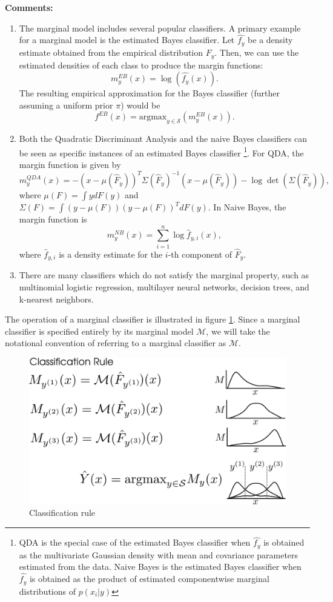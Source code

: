 \textbf{Comments:}
\begin{enumerate}
\item The marginal model includes several popular classifiers.
A primary example for a marginal model is the estimated Bayes
classifier. Let $\hat{f_y}$ be a density estimate obtained from the
empirical distribution $\hat{F_y}$. Then, we can use the estimated
densities of each class to produce the margin functions:
\[ m^{EB}_y(x) = \log(\hat{f_{y}}(x)).\]
The resulting empirical approximation for the Bayes classifier
(further assuming a uniform prior $\pi$) would be
\[ f^{EB}(x) = \text{argmax}_{y \in \mathcal{S}}(m^{EB}_y(x)).\]
\item Both the Quadratic Discriminant Analysis and the naive Bayes classifiers can be seen as specific instances of an estimated Bayes classifier
\footnote{QDA is the special case of the estimated Bayes classifier when $\hat{f_y}$ is obtained as
the multivariate Gaussian density with mean and covariance parameters estimated from the data.
Naive Bayes is the estimated Bayes classifier when $\hat{f_y}$ is obtained as the product of estimated componentwise marginal distributions
of $p(x_i|y)$}. 
For QDA, the margin function is
given by
\[
m_y^{QDA}(x) = -(x - \mu(\hat{F}_y))^T \Sigma(\hat{F}_y)^{-1} (x-\mu(\hat{F}_y)) - \log\det(\Sigma(\hat{F}_y)),
\]
where $\mu(F) = \int y dF(y)$ and $\Sigma(F) = \int (y-\mu(F))(y-\mu(F))^T dF(y)$.
In Naive Bayes, the margin function is
\[
m^{NB}_y(x) = \sum_{i=1}^n \log \hat{f}_{y, i}(x),
\]
where $\hat{f}_{y, i}$ is a density estimate for the $i$-th component of
$\hat{F}_y$.
\item There are many classifiers which do not satisfy the marginal property, such as multinomial logistic regression,
multilayer neural networks, decision trees, and k-nearest neighbors.
\end{enumerate}

The operation of a marginal classifier is illustrated in figure
\ref{fig:classification_rule}.  Since a marginal classifier is
specified entirely by its marginal model $\mathcal{M}$, we will take
the notational convention of referring to a marginal classifier as
$\mathcal{M}$.

\begin{figure}[h]
\centering
\includegraphics[scale = 0.4]{../extrapolation_figures/classification_rule.png}
\caption{Classification rule}\label{fig:classification_rule}
\end{figure}

